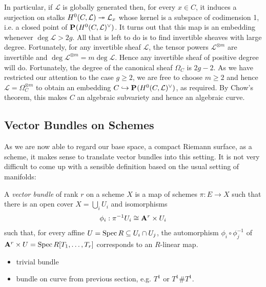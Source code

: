 \documentclass[12pt]{ociamthesis}  %
\begin{document}
In particular, if $\mathcal L$ is globally generated then,
for every $x\in C$, it induces a surjection on stalks
$H^0(C,\mathcal L) \twoheadrightarrow \mathcal L_x$ whose kernel is a
subspace of codimension 1, i.e. a closed point of
$\mathbf{P}^{}_{}(H^0(C,\mathcal L)^\vee)$. It turns out that this map is an embedding
whenever $\deg\mathcal L > 2g$. \cite[Proposition 2.14]{harris2011}
All that is left to do is to find invertible sheaves with large
degree. Fortunately, for any invertible sheaf $\mathcal L$,
the tensor powers $\mathcal L^{\otimes m}$ are invertible and
$\deg\mathcal L^{\otimes m} = m\deg\mathcal L$. Hence any invertible
sheaf of positive degree will do. Fortunately, the degree of
the canonical sheaf $\Omega_C$ is $2g-2$. As we have restricted
our attention to the case $g\geq 2$, we are free to choose
$m\geq 2$ and hence $\mathcal L = \Omega_C^{\otimes m}$ to obtain
an embedding $C\hookrightarrow\mathbf{P}^{}_{}(H^0(C,\mathcal L)^\vee)$, as
required.
By Chow's theorem, this makes $C$ an algebraic subvariety
and hence an algebraic curve.

\subsection{Vector Bundles on Schemes}

As we are now able to regard our base space, a compact Riemann
surface, as a scheme, it makes sense to translate vector bundles
into this setting. It is not very difficult to come up with a
sensible definition based on the usual setting of manifolds:

\begin{definition}
  \label{def:vector_bundle}
  A \emph{vector bundle} of rank $r$ on a scheme $X$ is
  a map of schemes $\pi : E \to X$ such that there is an open
  cover $X = \bigcup_i U_i$ and isomorphisms
  \begin{align}\label{eq:trivialisation}
    \phi_i : {\pi}^{-1}U_i \cong \mathbf{A}^{r}_{}\times U_i
  \end{align}
  such that, for every affine $U = \operatorname{Spec} R \subseteq U_i \cap U_j$,
  the automorphism $\phi_i \circ \phi^{-1}_j$
  of $\mathbf{A}^{r}_{}\times U = \operatorname{Spec} R[T_1,\ldots,T_r]$
  corresponds to an $R$-linear map.
\end{definition}

\begin{example}
  \begin{itemize}
    \item trivial bundle
    \item bundle on curve from previous section, e.g. $T^1$ or
      $T^1 \# T^1$.
  \end{itemize}
\end{example}
\end{document}
